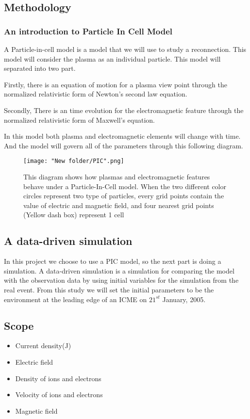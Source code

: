 \documentclass[12pt, a4paper]{article}
\begin{document}
\subsection*{Methodology}
\subsubsection*{ An introduction to Particle In Cell Model}
A Particle-in-cell model is a model that we will use to study a reconnection. This model will consider the plasma as an individual particle. This model will separated into two part. \par Firstly, there is an equation of motion for a plasma view point through the normalized relativistic form of Newton's second law equation.\par Secondly, There is an time evolution for the electromagnetic feature through the normalized relativistic form of Maxwell's equation.\par In this model both plasma and electromagnetic elements will change with time. And the model will govern all of the parameters through this following diagram.
\begin{figure}[h!]
\centering
\texttt{[image: "New folder/PIC".png]}
\caption{This diagram shows how plasmas and electromagnetic features behave under  a Particle-In-Cell model. When the two different color circles represent two type of particles, every grid points contain the value of electric and magnetic field, and four nearest grid points (Yellow dash box) represent 1 cell }
\end{figure}
\newpage
\subsection*{ A data-driven simulation}
In this project we choose to use a PIC model, so the next part is doing a simulation. A data-driven simulation is a simulation for comparing the model with the observation data by using initial variables for the simulation from the real event. From this study we will set the initial parameters to be the environment at the leading edge of an ICME on $\text{21}^{st}$ January, 2005.

\subsection*{Scope}
\begin{itemize}
\item Current density(J)
\item Electric field
\item Density of ions and electrons
\item Velocity of ions and electrons
\item Magnetic field
\end{itemize}
\end{document}
